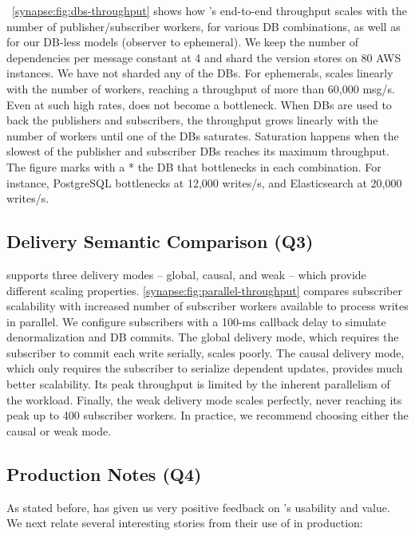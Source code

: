 \F~\ref{synapse:fig:dbs-throughput} shows how \synapse's end-to-end throughput scales
with the number of publisher/subscriber workers, for various DB
combinations, as well as for our
DB-less models (observer to ephemeral). We keep the number of dependencies per
message constant at 4 and shard the version stores on 80 AWS instances. We have not sharded
any of the DBs. For ephemerals, \synapse scales linearly with the number of
workers, reaching a throughput of more than 60,000 msg/s. Even at such high
rates, \synapse does not become a bottleneck.  When DBs are used to
back the publishers and subscribers, the throughput grows linearly with the
number of workers until one of the DBs saturates. Saturation happens when the
slowest of the publisher and subscriber DBs reaches its maximum throughput. The
figure marks with a * the DB that bottlenecks in each combination. For
instance, PostgreSQL bottlenecks at 12,000 writes/s, and Elasticsearch at
20,000 writes/s.

\subsection{Delivery Semantic Comparison (Q3)}
\label{synapse:sec:evaluation:delivery}

\synapse supports three delivery modes -- global, causal, and weak -- which
provide different scaling properties.
\F\ref{synapse:fig:parallel-throughput} compares subscriber scalability with 
increased number of subscriber workers available to process writes in parallel.
We configure subscribers with a 100-ms callback delay to simulate
denormalization and DB commits.  The global delivery mode, which requires the
subscriber to commit each write serially, scales poorly.  The causal
delivery mode, which only requires the subscriber to serialize dependent
updates, provides much better scalability.  Its peak throughput is limited by
the inherent parallelism of the workload.  Finally, the weak delivery mode
scales perfectly, never reaching its peak up to 400 subscriber workers.
In practice, we recommend choosing either the causal or weak mode.

\subsection{Production Notes (Q4)}
\label{synapse:sec:eval:ease-of-use}

As stated before, \crowdtap has given us very positive feedback on \synapse's
usability and value.  We next relate several interesting stories from
their use of \synapse in production:

